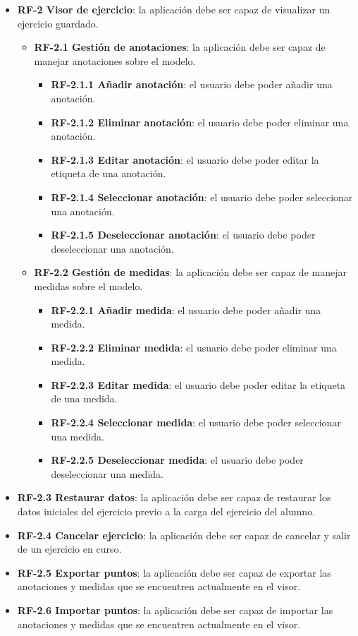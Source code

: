\begin{itemize}
	\item \textbf{RF-2 Visor de ejercicio}: la aplicación debe ser capaz de visualizar un ejercicio guardado.
	\begin{itemize}
		\item \textbf{RF-2.1 Gestión de anotaciones}: la aplicación debe ser capaz de manejar anotaciones sobre el modelo.
		\begin{itemize}
			\item \textbf{RF-2.1.1 Añadir anotación}: el usuario debe poder añadir una anotación.
			\item \textbf{RF-2.1.2 Eliminar anotación}: el usuario debe poder eliminar una anotación.
			\item \textbf{RF-2.1.3 Editar anotación}: el usuario debe poder editar la etiqueta de una anotación.
			\item \textbf{RF-2.1.4 Seleccionar anotación}: el usuario debe poder seleccionar una anotación.
			\item \textbf{RF-2.1.5 Deseleccionar anotación}: el usuario debe poder deseleccionar una anotación.
		\end{itemize}
	\end{itemize}
	\begin{itemize}
		\item \textbf{RF-2.2 Gestión de medidas}: la aplicación debe ser capaz de manejar medidas sobre el modelo.
		\begin{itemize}
			\item \textbf{RF-2.2.1 Añadir medida}: el usuario debe poder añadir una medida.
			\item \textbf{RF-2.2.2 Eliminar medida}: el usuario debe poder eliminar una medida.
			\item \textbf{RF-2.2.3 Editar medida}: el usuario debe poder editar la etiqueta de una medida.
			\item \textbf{RF-2.2.4 Seleccionar medida}: el usuario debe poder seleccionar una medida.
			\item \textbf{RF-2.2.5 Deseleccionar medida}: el usuario debe poder deseleccionar una medida.
		\end{itemize}
	\end{itemize}
	\item \textbf{RF-2.3 Restaurar datos}: la aplicación debe ser capaz de restaurar los datos iniciales del ejercicio previo a la carga del ejercicio del alumno.
	\item \textbf{RF-2.4 Cancelar ejercicio}: la aplicación debe ser capaz de cancelar y salir de un ejercicio en curso.
	\item \textbf{RF-2.5 Exportar puntos}: la aplicación debe ser capaz de exportar las anotaciones y medidas que se encuentren actualmente en el visor.
	\item \textbf{RF-2.6 Importar puntos}: la aplicación debe ser capaz de importar las anotaciones y medidas que se encuentren actualmente en el visor.


\end{itemize}
